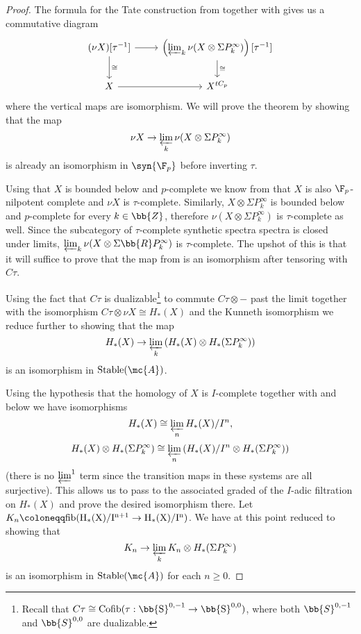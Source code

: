 \begin{proof}
    The formula for the Tate construction from 
    together with  gives us a commutative diagram
    \[ \begin{tikzcd}
        (\nu X)[\tau^{-1}] \ar[r] \ar[d, "\cong"] & 
        \left( \varprojlim_{k} \nu(X \otimes \Sigma P^{\infty}_{k}) \right)[\tau^{-1}] \ar[d, "\cong"] \\
        X \ar[r] &
        X^{tC_p}
    \end{tikzcd} \]
    where the vertical maps are isomorphism.
    We will prove the theorem by showing that the map
    \begin{align} \nu X \to \varprojlim_{k} \nu(X \otimes \Sigma P^{\infty}_{k}) \label{eqn:want-iso} \end{align}
    is already an isomorphism in $\syn{\F_p}$ before inverting $\tau$.

    Using that $X$ is bounded below and $p$-complete we know from  
    that $X$ is also $\F_p$-nilpotent complete and $\nu X$ is $\tau$-complete.
    Similarly, $X \otimes \Sigma P^\infty_k$ is bounded below and $p$-complete for every $k \in \bb{Z}$, therefore
    $\nu(X \otimes \Sigma P^{\infty}_{k})$ is $\tau$-complete as well.
    Since the subcategory of $\tau$-complete synthetic spectra spectra is closed under limits, 
    $\varprojlim_{k} \nu(X \otimes \Sigma \bb{R}P^{\infty}_{k})$ is $\tau$-complete. 
    The upshot of this is that it will suffice to prove that the map from 
    is an isomorphism after tensoring with $C\tau$.
    
    Using the fact that $C\tau$ is dualizable\footnote{Recall that $C\tau \cong \rm{Cofib}(\tau : \bb{S}^{0,-1} \rightarrow \bb{S}^{0,0})$, where both $\bb{S}^{0,-1}$ and $\bb{S}^{0,0}$ are dualizable.} to commute $C\tau \otimes -$ past the limit 
    together with the isomorphism $ C\tau \otimes \nu X \cong H_{*}(X)$ and the Kunneth isomorphism 
    we reduce further to showing that the map
    \[ H_{*}(X) \rightarrow \varprojlim_k  \left( H_{*}(X) \otimes H_{*}(\Sigma P^{\infty}_{k}) \right) \]
    is an isomorphism in $\mathrm{Stable}(\mc{A})$.
    
    Using the hypothesis that the homology of $X$ is $I$-complete 
    together with  and  below we have isomorphisms
    \[ H_{*}(X) \cong \varprojlim_n H_{*}(X)/I^n, \] 
    \[ H_{*}(X) \otimes H_{*}(\Sigma P^{\infty}_{k}) \cong \varprojlim_n \left( H_{*}(X)/I^n \otimes H_{*}(\Sigma P^{\infty}_{k}) \right) \]
    (there is no $\varprojlim^1$ term since the transition maps in these systems are all surjective).
    This allows us to pass to the associated graded of the $I$-adic filtration on $H_*(X)$ and prove the desired isomorphism there.
    Let $K_n \coloneqq \rm{fib}(H_{*}(X)/I^{n+1} \rightarrow H_{*}(X)/I^{n})$. 
    We have at this point reduced to showing that 
    \[ K_n \rightarrow \varprojlim_k K_n \otimes H_{*}(\Sigma P^{\infty}_{k}) \] 
    is an isomorphism in $\mathrm{Stable}(\mc{A})$ for each $n \geq 0$.
    

\end{proof}
